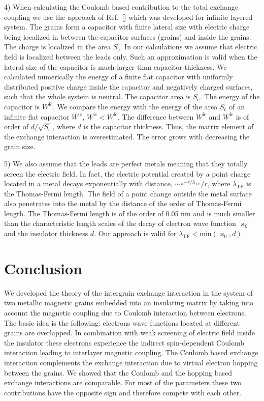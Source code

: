 \documentclass[aps,prb,amsmath,amssymb,twocolumn,superscriptaddress,showpacs,floatfix]{revtex4-1}
\begin{document}
4) When calculating the Coulomb based contribution to the total
exchange coupling we use the approach of Ref.~[] which
was developed for infinite layered system. The grains form a capacitor
with finite lateral size with electric charge being  localized in between the
capacitor surfaces (grains) and inside the grains. The
charge is localized in the area $S_\mathrm c$. In our calculations we assume
that electric field is localized between the leads only. Such an approximation
is valid when the lateral size of the capacitor is much larger than
capacitor thickness. We calculated numerically the energy of a finite flat
capacitor with uniformly distributed positive charge inside the capacitor
and negatively charged surfaces, such that the whole system is neutral.
The capacitor area is $S_\mathrm c$. The energy of the capacitor is $W^{\mathrm{fc}}$.
We compare the energy with the energy of the area $S_\mathrm c$ of an
infinite flat capacitor $W^{\mathrm{ic}}$,
$W^{\mathrm{ic}}<W^{\mathrm{fc}}$. The difference between $W^{\mathrm{ic}}$
and $W^{\mathrm{fc}}$ is of order of $d/\sqrt{S_\mathrm c}$, where $d$ is
the capacitor thickness. Thus, the matrix element of the exchange interaction
is overestimated. The error grows with decreasing the grain size.

5) We also assume that the leads are perfect metals
meaning that they totally screen the electric field. In fact,
the electric potential created by a point charge located in a
metal decays exponentially with distance, $\sim e^{-r/\lambda_\mathrm{TF}}/r$,
where $\lambda_\mathrm{TF}$ is the Thomas-Fermi length. The field of a point
change outside the metal surface also penetrates into the metal by
the distance of the order of Thomas-Fermi length. The Thomas-Fermi
length is of the order of 0.05 nm and is much smaller than
the characteristic length scales of the decay of electron
wave function $\varkappa_0$ and the insulator thickness $d$.
Our approach is valid for $\lambda_\mathrm{TF} < \mathrm{min}(\varkappa_0, d)$.



\section{Conclusion}


We developed the theory of the intergrain exchange interaction in the
system of two metallic magnetic grains embedded into an insulating matrix by
taking into account the magnetic coupling due to Coulomb interaction
between electrons. The basic idea is the following:
electrons wave functions located at different grains are overlapped.
In combination with weak screening of electric field inside the
insulator these electrons experience the indirect spin-dependent Coulomb interaction
leading to interlayer magnetic coupling. The Coulomb based exchange interaction
complements the exchange interaction due to virtual electron hopping between
the grains. We showed that the Coulomb and the hopping based exchange interactions are
comparable. For most of the parameters these two contributions have the
opposite sign and therefore compete with each other. 
\end{document}
